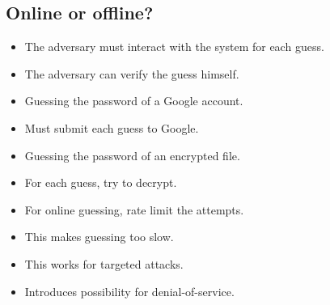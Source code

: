 \subsection{Online or offline?}

\begin{frame}
  \begin{definition}[Online]
    \begin{itemize}
      \item The adversary must interact with the system for each guess.
    \end{itemize}
  \end{definition}

  \pause

  \begin{definition}[Offline]
    \begin{itemize}
      \item The adversary can verify the guess himself.
    \end{itemize}
  \end{definition}
\end{frame}

\begin{frame}
  \begin{example}[Online]
    \begin{itemize}
      \item Guessing the password of a Google account.
      \item Must submit each guess to Google.
    \end{itemize}
  \end{example}

  \pause

  \begin{example}[Offline]
    \begin{itemize}
      \item Guessing the password of an encrypted file.
      \item For each guess, try to decrypt.
    \end{itemize}
  \end{example}
\end{frame}

\begin{frame}
  \begin{solution}
    \begin{itemize}
      \item For online guessing, rate limit the attempts.
      \item This makes guessing too slow.
    \end{itemize}
  \end{solution}

  \pause

  \begin{remark}
    \begin{itemize}
      \item This works for targeted attacks.
      \item Introduces possibility for denial-of-service.
    \end{itemize}
  \end{remark}
\end{frame}

